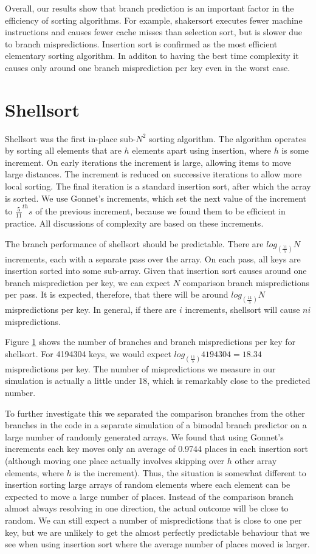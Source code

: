\documentclass[acmtocl]{acmtrans2m}
\begin{document}
Overall, our results show that branch prediction is an important
factor in the efficiency of sorting algorithms. For example,
shakersort executes fewer machine instructions and causes fewer cache
misses than selection sort, but is slower due to branch
mispredictions. Insertion sort is confirmed as the most efficient
elementary sorting algorithm. In additon to having the best time
complexity it causes only around one branch misprediction per key even
in the worst case.

\section{Shellsort}
Shellsort \cite{Shell59} was the first in-place sub-$N^2$ sorting
algorithm. The algorithm operates by sorting all elements that are $h$
elements apart using insertion, where $h$ is some increment.  On early
iterations the increment is large, allowing items to move large
distances. The increment is reduced on successive iterations to allow
more local sorting. The final iteration is a standard insertion sort,
after which the array is sorted. We use Gonnet's increments, which set
the next value of the increment to $\frac{5}{11}^{th}s$ of the
previous increment, because we found them to be efficient in practice.
All discussions of complexity are based on these increments.

The branch performance of shellsort should be predictable. There are
$log_{(\frac{11}{5})}N$ increments, each with a separate pass over the
array. On each pass, all keys are insertion sorted into some
sub-array. Given that insertion sort causes around one branch
misprediction per key, we can expect $N$ comparison branch
mispredictions per pass. It is expected, therefore, that there will be
around $log_{(\frac{11}{5})}N$ mispredictions per key. In general, if
there are $i$ increments, shellsort will cause $ni$ mispredictions.

Figure \ref{} shows the number of branches and branch mispredictions
per key for shellsort. For 4194304 keys, we would expect
$log_{(\frac{11}{5})}4194304 = 18.34$ mispredictions per key. The
number of mispredictions we measure in our simulation is actually a
little under 18, which is remarkably close to the predicted number.

To further investigate this we separated the comparison branches from
the other branches in the code in a separate simulation of a bimodal
branch predictor on a large number of randomly generated arrays. We
found that using Gonnet's increments each key moves only an average of
0.9744 places in each insertion sort (although moving one place
actually involves skipping over $h$ other array elements, where $h$ is
the increment). Thus, the situation is somewhat different to insertion
sorting large arrays of random elements where each element can be
expected to move a large number of places. Instead of the comparison
branch almost always resolving in one direction, the actual outcome
will be close to random. We can still expect a number of
mispredictions that is close to one per key, but we are unlikely to
get the almost perfectly predictable behaviour that we see when using
insertion sort where the average number of places moved is larger.
\end{document}
